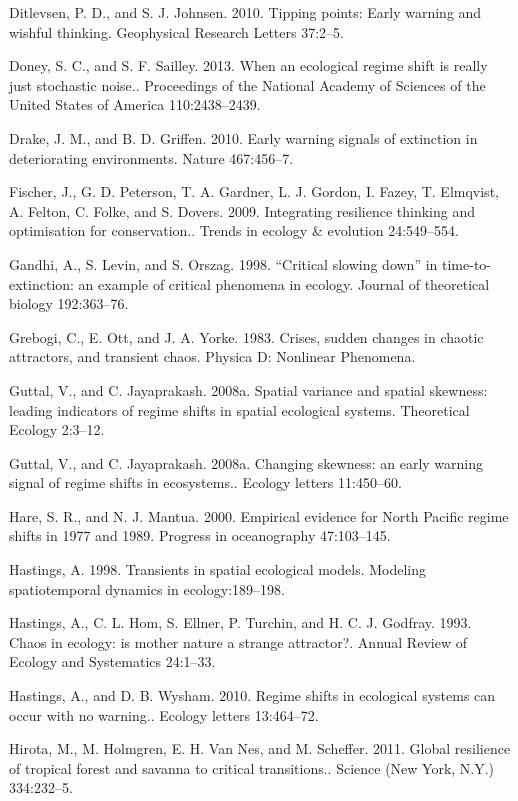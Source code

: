 \documentclass{article}
\begin{document}
Ditlevsen, P. D., and S. J. Johnsen. 2010. Tipping points: Early warning
and wishful thinking. Geophysical Research Letters 37:2--5.

Doney, S. C., and S. F. Sailley. 2013. When an ecological regime shift
is really just stochastic noise.. Proceedings of the National Academy of
Sciences of the United States of America 110:2438--2439.

Drake, J. M., and B. D. Griffen. 2010. Early warning signals of
extinction in deteriorating environments. Nature 467:456--7.

Fischer, J., G. D. Peterson, T. A. Gardner, L. J. Gordon, I. Fazey, T.
Elmqvist, A. Felton, C. Folke, and S. Dovers. 2009. Integrating
resilience thinking and optimisation for conservation.. Trends in
ecology \& evolution 24:549--554.

Gandhi, A., S. Levin, and S. Orszag. 1998. ``Critical slowing down'' in
time-to-extinction: an example of critical phenomena in ecology. Journal
of theoretical biology 192:363--76.

Grebogi, C., E. Ott, and J. A. Yorke. 1983. Crises, sudden changes in
chaotic attractors, and transient chaos. Physica D: Nonlinear Phenomena.

Guttal, V., and C. Jayaprakash. 2008a. Spatial variance and spatial
skewness: leading indicators of regime shifts in spatial ecological
systems. Theoretical Ecology 2:3--12.

Guttal, V., and C. Jayaprakash. 2008a. Changing skewness: an early
warning signal of regime shifts in ecosystems.. Ecology letters
11:450--60.

Hare, S. R., and N. J. Mantua. 2000. Empirical evidence for North
Pacific regime shifts in 1977 and 1989. Progress in oceanography
47:103--145.

Hastings, A. 1998. Transients in spatial ecological models. Modeling
spatiotemporal dynamics in ecology:189--198.

Hastings, A., C. L. Hom, S. Ellner, P. Turchin, and H. C. J. Godfray.
1993. Chaos in ecology: is mother nature a strange attractor?. Annual
Review of Ecology and Systematics 24:1--33.

Hastings, A., and D. B. Wysham. 2010. Regime shifts in ecological
systems can occur with no warning.. Ecology letters 13:464--72.

Hirota, M., M. Holmgren, E. H. Van Nes, and M. Scheffer. 2011. Global
resilience of tropical forest and savanna to critical transitions..
Science (New York, N.Y.) 334:232--5.
\end{document}
